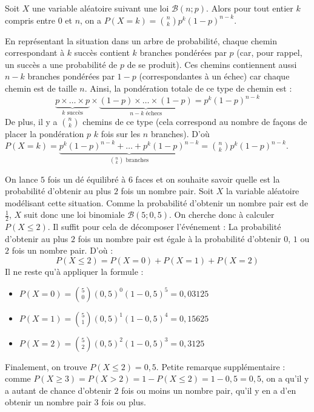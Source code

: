 	\begin{formula}
		Soit $X$ une variable aléatoire suivant une loi $\mathcal{B}(n; p)$. Alors pour tout entier $k$ compris entre $0$ et $n$, on a $P(X = k) = \binom{n}{k} p^k (1-p)^{n-k}$.
	\end{formula}

	\begin{demonstration}
		\contentwidth[big]
		En représentant la situation dans un arbre de probabilité, chaque chemin correspondant à $k$ succès contient $k$ branches pondérées par $p$ (car, pour rappel, un succès a une probabilité de $p$ de se produit). Ces chemins contiennent aussi $n-k$ branches pondérées par $1-p$ (correspondantes à un échec) car chaque chemin est de taille $n$. Ainsi, la pondération totale de ce type de chemin est :
		\[ \underbrace{p \times \dots \times p}_{k \text{ succès}} \times \underbrace{(1-p) \times \dots \times (1-p)}_{n-k \text{ échecs}} = p^k(1-p)^{n-k} \]
		De plus, il y a $\binom{n}{k}$ chemins de ce type (cela correspond au nombre de façons de placer la pondération $p$ $k$ fois sur les $n$ branches).
		\newpar
		D'où $P(X = k) = \underbrace{p^k(1-p)^{n-k} + \dots + p^k(1-p)^{n-k}}_{\binom{n}{k} \text{ branches}} = \binom{n}{k} p^k(1-p)^{n-k}$.
	\end{demonstration}

	\begin{tip}[Exemple]
		On lance $5$ fois un dé équilibré à $6$ faces et on souhaite savoir quelle est la probabilité d'obtenir au plus $2$ fois un nombre pair.
		\newpar
		Soit $X$ la variable aléatoire modélisant cette situation. Comme la probabilité d'obtenir un nombre pair est de $\frac{1}{2}$, $X$ suit donc une loi binomiale $\mathcal{B}(5; 0,5)$.
		\newpar
		On cherche donc à calculer $P(X \leq 2)$. Il suffit pour cela de décomposer l'événement :
		\newpar
		La probabilité d'obtenir au plus $2$ fois un nombre pair est égale à la probabilité d'obtenir $0$, $1$ ou $2$ fois un nombre pair. D'où :
		\[ P(X \leq 2) = P(X = 0) + P(X = 1) + P(X = 2) \]
		Il ne reste qu'à appliquer la formule :
		\begin{itemize}
			\item $P(X = 0) = \binom{5}{0}(0,5)^0(1-0,5)^5 = 0,03125$
			\item $P(X = 1) = \binom{5}{1}(0,5)^1(1-0,5)^4 = 0,15625$
			\item $P(X = 2) = \binom{5}{2}(0,5)^2(1-0,5)^3 = 0,3125$
		\end{itemize}
		Finalement, on trouve $P(X \leq 2) = 0,5$.
		\newpar
		Petite remarque supplémentaire : comme $P(X \geq 3) = P(X > 2) = 1 - P(X \leq 2) = 1 - 0,5 = 0,5$, on a qu'il y a autant de chance d'obtenir $2$ fois ou moins un nombre pair, qu'il y en a d'en obtenir un nombre pair $3$ fois ou plus.
	\end{tip}

